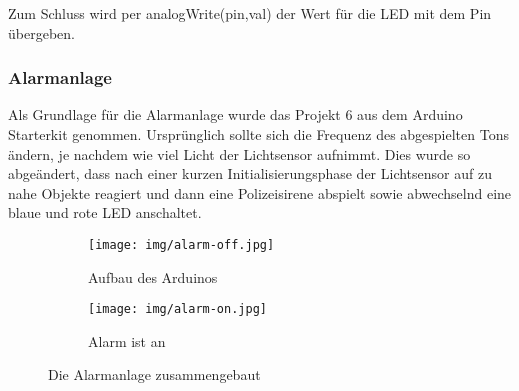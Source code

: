 Zum Schluss wird per analogWrite(pin,val) der Wert für die LED mit dem Pin übergeben.

\subsubsection{Alarmanlage}
Als Grundlage für die Alarmanlage wurde das Projekt 6 aus dem Arduino Starterkit genommen. Ursprünglich sollte sich die Frequenz des abgespielten Tons ändern, je nachdem wie viel Licht der Lichtsensor aufnimmt. Dies wurde so abgeändert, dass nach einer kurzen Initialisierungsphase der Lichtsensor auf zu nahe Objekte reagiert und dann eine Polizeisirene abspielt sowie abwechselnd eine blaue und rote LED anschaltet.

\begin{figure}[h]
	\centering
	\begin{subfigure}[b]{0.48\linewidth}
		\centering
		\texttt{[image: img/alarm-off.jpg]}
		\caption{Aufbau des Arduinos}
	\end{subfigure}\enspace%
	\begin{subfigure}[b]{0.48\linewidth}
		\centering
		\texttt{[image: img/alarm-on.jpg]}
		\caption{Alarm ist an}
	\end{subfigure}
	\caption{Die Alarmanlage zusammengebaut}
\end{figure}

